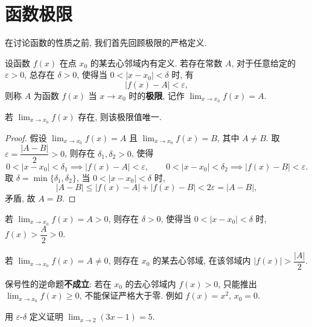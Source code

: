 \documentclass[a4paper,12pt,oneside]{maki-notes}
\begin{document}
	\section{函数极限}
	
	在讨论函数的性质之前, 我们首先回顾极限的严格定义.
	
	\begin{definition}
		设函数 $f(x)$ 在点 $x_0$ 的某去心邻域内有定义. 若存在常数 $A$, 对于任意给定的 $\varepsilon > 0$, 总存在 $\delta > 0$, 使得当 $0 < |x - x_0| < \delta$ 时, 有
		\[
		|f(x) - A| < \varepsilon,
		\]
		则称 $A$ 为函数 $f(x)$ 当 $x \to x_0$ 时的\textbf{极限}, 记作 $\lim_{x \to x_0} f(x) = A$.
	\end{definition}
	
	\begin{theorem}[极限的唯一性]
		若 $\lim_{x \to x_0} f(x)$ 存在, 则该极限值唯一.
	\end{theorem}
	
	\begin{proof}
		假设 $\lim_{x \to x_0} f(x) = A$ 且 $\lim_{x \to x_0} f(x) = B$, 其中 $A \neq B$. 取 $\varepsilon = \dfrac{|A - B|}{2} > 0$, 则存在 $\delta_1, \delta_2 > 0$, 使得
		\[
		0 < |x - x_0| < \delta_1 \implies |f(x) - A| < \varepsilon, \qquad
		0 < |x - x_0| < \delta_2 \implies |f(x) - B| < \varepsilon.
		\]
		取 $\delta = \min\{\delta_1, \delta_2\}$, 当 $0 < |x - x_0| < \delta$ 时,
		\[
		|A - B| \le |f(x) - A| + |f(x) - B| < 2\varepsilon = |A - B|,
		\]
		矛盾, 故 $A = B$.
	\end{proof}
	
	\begin{theorem}[极限的保号性]
		若 $\lim_{x \to x_0} f(x) = A > 0$, 则存在 $\delta > 0$, 使得当 $0 < |x - x_0| < \delta$ 时, $f(x) > \dfrac{A}{2} > 0$.
	\end{theorem}
	
	\begin{corollary}
		若 $\lim_{x \to x_0} f(x) = A \neq 0$, 则存在 $x_0$ 的某去心邻域, 在该邻域内 $|f(x)| > \dfrac{|A|}{2}$.
	\end{corollary}
	
	\begin{note}
		保号性的逆命题\textbf{不成立}: 若在 $x_0$ 的去心邻域内 $f(x) > 0$, 只能推出 $\lim_{x \to x_0} f(x) \ge 0$, 不能保证严格大于零. 例如 $f(x) = x^2$, $x_0 = 0$.
	\end{note}
	
	\begin{example}
		用 $\varepsilon$-$\delta$ 定义证明 $\lim_{x \to 2} (3x - 1) = 5$.
	\end{example}
	
\end{document}
